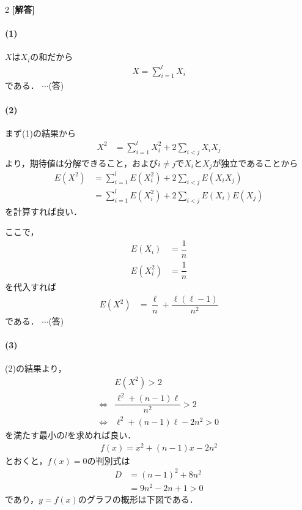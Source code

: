 \documentclass[../../main.tex]{subfiles}
\begin{document}
\setcounter{equation}{0}
\begin{oframed}
  
\end{oframed}
\setlength{\columnseprule}{0.4pt}
\begin{multicols}{2}
  {\bf [解答]}

  \paragraph{(1)}
  $X$は$X_i$の和だから
  \begin{align}
    X = \sum_{i=1}^{l} X_i
  \end{align}
  である．  $\cdots$(答)

  \paragraph{(2)}
  まず(1)の結果から
  \begin{align}
    X^2 & = \sum_{i=1}^{l} X_i^2 + 2\sum_{i < j} X_i X_j
  \end{align}
  より，期待値は分解できること，および$i\neq j$で$X_i$と$X_j$が独立であることから
  \begin{align}
    E(X^2)
    & = \sum_{i=1}^{l} E(X_i^2) + 2\sum_{i < j} E(X_i X_j)   \\
    & = \sum_{i=1}^{l} E(X_i^2) + 2\sum_{i < j} E(X_i)E(X_j)
  \end{align}
  を計算すれば良い．

  ここで，
  \begin{align}
    E(X_i)   & = \dfrac{1}{n} \\
    E(X_i^2) & = \dfrac{1}{n}
  \end{align}
  を代入すれば
  \begin{align}
    E(X^2) & = \dfrac{\ell}{n} + \dfrac{\ell(\ell-1)}{n^2}
  \end{align}
  である．  $\cdots$(答)

  \paragraph{(3)}
  (2)の結果より，
  \begin{align}
    & E(X^2) > 2                         \\
    \iff
    & \dfrac{\ell^2 + (n-1)\ell}{n^2} > 2 \\
    \iff
    & \ell^2 + (n-1)\ell -2n^2 > 0
  \end{align}
  を満たす最小の$l$を求めれば良い．
  \begin{align}
    f(x) = x^2 + (n-1)x -2n^2
  \end{align}
  とおくと，$f(x)=0$の判別式は
  \begin{align}
    D
    & = (n-1)^2+8n^2 \\
    & = 9n^2-2n+1
    > 0
  \end{align}
  であり，$y=f(x)$のグラフの概形は下図である．


\end{multicols}
\end{document}
